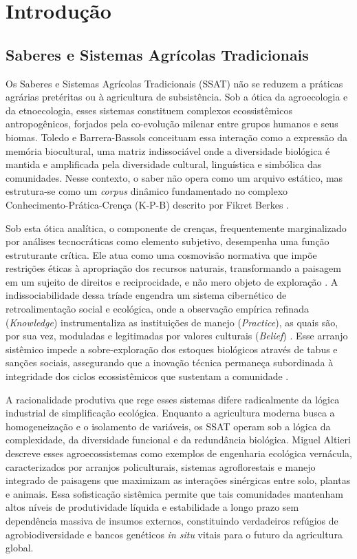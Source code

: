 \pagestyle{plain}
\chapter{Introdução}

\section{Saberes e Sistemas Agrícolas Tradicionais}

Os Saberes e Sistemas Agrícolas Tradicionais (SSAT) não se reduzem a práticas agrárias pretéritas ou à agricultura de subsistência. Sob a ótica da agroecologia e da etnoecologia, esses sistemas constituem complexos ecossistêmicos antropogênicos, forjados pela co-evolução milenar entre grupos humanos e seus biomas. Toledo e Barrera-Bassols \cite{Toledo2008} conceituam essa interação como a expressão da memória biocultural, uma matriz indissociável onde a diversidade biológica é mantida e amplificada pela diversidade cultural, linguística e simbólica das comunidades. Nesse contexto, o saber não opera como um arquivo estático, mas estrutura-se como um \textit{corpus} dinâmico fundamentado no complexo Conhecimento-Prática-Crença (K-P-B) descrito por Fikret Berkes \cite{Berkes2017}.

Sob esta ótica analítica, o componente de crenças, frequentemente marginalizado por análises tecnocráticas como elemento subjetivo, desempenha uma função estruturante crítica. Ele atua como uma cosmovisão normativa que impõe restrições éticas à apropriação dos recursos naturais, transformando a paisagem em um sujeito de direitos e reciprocidade, e não mero objeto de exploração \cite{Toledo2008}. A indissociabilidade dessa tríade engendra um sistema cibernético de retroalimentação social e ecológica, onde a observação empírica refinada (\textit{Knowledge}) instrumentaliza as instituições de manejo (\textit{Practice}), as quais são, por sua vez, moduladas e legitimadas por valores culturais (\textit{Belief}) \cite{Berkes2017,Ostrom1990}. Esse arranjo sistêmico impede a sobre-exploração dos estoques biológicos através de tabus e sanções sociais, assegurando que a inovação técnica permaneça subordinada à integridade dos ciclos ecossistêmicos que sustentam a comunidade \cite{Berkes2003}.

A racionalidade produtiva que rege esses sistemas difere radicalmente da lógica industrial de simplificação ecológica. Enquanto a agricultura moderna busca a homogeneização e o isolamento de variáveis, os SSAT operam sob a lógica da complexidade, da diversidade funcional e da redundância biológica. Miguel Altieri \cite{Altieri1995} descreve esses agroecossistemas como exemplos de engenharia ecológica vernácula, caracterizados por arranjos policulturais, sistemas agroflorestais e manejo integrado de paisagens que maximizam as interações sinérgicas entre solo, plantas e animais. Essa sofisticação sistêmica permite que tais comunidades mantenham altos níveis de produtividade líquida e estabilidade a longo prazo sem dependência massiva de insumos externos, constituindo verdadeiros refúgios de agrobiodiversidade e bancos genéticos \textit{in situ} vitais para o futuro da agricultura global.

